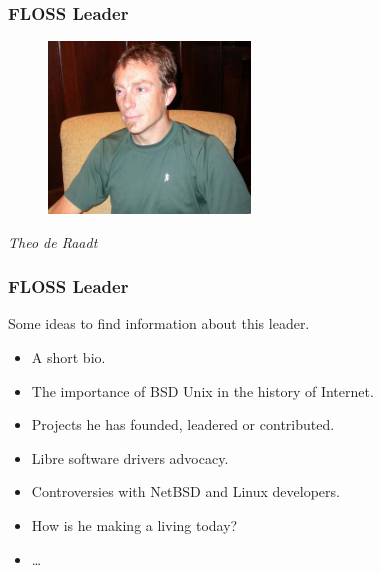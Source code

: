 \documentclass{beamer}
\begin{document}
\begin{frame}
\frametitle{FLOSS Leader}

\begin{figure}[h]
\begin{center}
  \includegraphics[height=1.80in]{figs/theo_de_raadt.jpg}
\end{center}
\end{figure}

\pause

\begin{center}
{\it Theo de Raadt}
\end{center}

\end{frame}

\begin{frame}
\frametitle{FLOSS Leader}

Some ideas to find information about this leader.
\pause
\begin{itemize}
\item A short bio.
\item The importance of BSD Unix in the history of Internet.
\item Projects he has founded, leadered or contributed.
\item Libre software drivers advocacy.
\item Controversies with NetBSD and Linux developers.
\item How is he making a living today?
\item \ldots
\end{itemize}

\end{frame}
\end{document}
